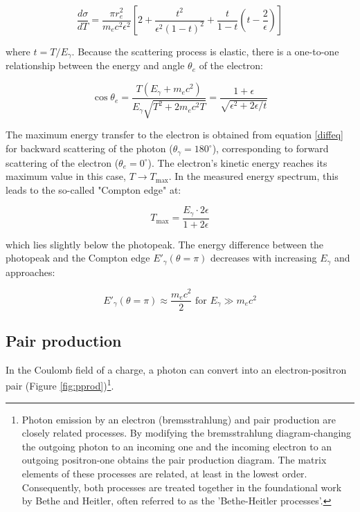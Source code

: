 \begin{equation}
\frac{d\sigma}{dT} = \frac{\pi r_e^2}{m_e c^2 \epsilon^2} \left[2 + \frac{t^2}{\epsilon^2 (1 - t)^2} + \frac{t}{1 - t}\left(t - \frac{2}{\epsilon}\right)\right]
\end{equation}

where $t = T/E_\gamma$. Because the scattering process is 
elastic, there is a one-to-one relationship between the 
energy and angle $\theta_e$ of the electron:

\begin{equation}
\cos \theta_e = \frac{T(E_\gamma + m_e c^2)}{E_\gamma \sqrt{T^2 + 2m_ec^2 T}} = \frac{1 + \epsilon}{\sqrt{\epsilon^2 + 2\epsilon/t}}
\end{equation}

The maximum energy transfer to the electron is obtained 
from equation \ref{diffeq} for backward scattering of the 
photon ($\theta_\gamma = 180^\circ$), corresponding to 
forward scattering of the electron ($\theta_e = 0^\circ$). 
The electron's kinetic energy reaches its maximum value in 
this case, $T \rightarrow T_{\text{max}}$. In the measured 
energy spectrum, this leads to the so-called "Compton edge" at:

\begin{equation}
T_{\text{max}} = \frac{E_\gamma \cdot 2\epsilon}{1 + 2\epsilon}
\end{equation}

which lies slightly below the photopeak. The energy difference 
between the photopeak and the Compton edge $E'_\gamma(\theta = \pi)$ 
decreases with increasing $E_\gamma$ and approaches:

\begin{equation}
E'_\gamma(\theta = \pi) \approx \frac{m_e c^2}{2} \text{ for } E_\gamma \gg m_e c^2
\end{equation}

\subsection{Pair production}
In the Coulomb field of a charge, a photon can 
convert into an electron-positron pair (Figure 
\ref{fig:pprod})\footnote{Photon emission by an 
electron (bremsstrahlung) and pair production are closely 
related processes. By modifying the bremsstrahlung diagram-changing 
the outgoing photon to an incoming one and the incoming electron to 
an outgoing positron-one obtains the pair production 
diagram. The matrix elements of these processes are 
related, at least in the lowest order. Consequently, both 
processes are treated together in the foundational work by 
Bethe and Heitler, often referred to as the 'Bethe-Heitler processes'.}.


